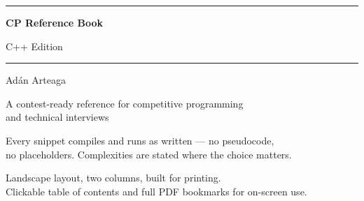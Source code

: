 \documentclass[10pt]{article}
\begin{document}

\begin{titlepage}
    \centering
    \vspace*{1.6cm}

    {\color{accent}\rule{\linewidth}{2.5pt}}
    \vspace{0.7cm}

    {\Huge\bfseries\color{accent} CP Reference Book\par}
    \vspace{0.5cm}
    {\LARGE C++ Edition\par}

    \vspace{0.5cm}
    {\color{accent}\rule{\linewidth}{2.5pt}}

    \vspace{1.4cm}
    {\Large Adán Arteaga\par}

    \vspace{1.4cm}
    {\large A contest-ready reference for competitive programming\\
    and technical interviews\par}

    \vspace{0.9cm}
    {\normalsize\color{cmt}
    Every snippet compiles and runs as written --- no pseudocode,\\
    no placeholders. Complexities are stated where the choice matters.\par}

    \vfill
    {\footnotesize\color{cmt}Landscape layout, two columns, built for printing.\\
    Clickable table of contents and full PDF bookmarks for on-screen use.\par}
\end{titlepage}

\thispagestyle{plain}
\tableofcontents
\newpage
{}

\end{document}
